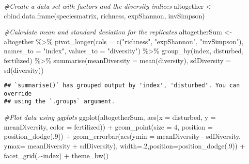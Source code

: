 \documentclass[
]{article}
\newenvironment{Shaded}{\begin{snugshade}}{\end{snugshade}}
\newcommand{\AttributeTok}[1]{\textcolor[rgb]{0.77,0.63,0.00}{#1}}
\newcommand{\CommentTok}[1]{\textcolor[rgb]{0.56,0.35,0.01}{\textit{#1}}}
\newcommand{\DecValTok}[1]{\textcolor[rgb]{0.00,0.00,0.81}{#1}}
\newcommand{\FunctionTok}[1]{\textcolor[rgb]{0.00,0.00,0.00}{#1}}
\newcommand{\NormalTok}[1]{#1}
\newcommand{\OtherTok}[1]{\textcolor[rgb]{0.56,0.35,0.01}{#1}}
\newcommand{\SpecialCharTok}[1]{\textcolor[rgb]{0.00,0.00,0.00}{#1}}
\newcommand{\StringTok}[1]{\textcolor[rgb]{0.31,0.60,0.02}{#1}}
\begin{document}
\begin{Shaded}
\begin{Highlighting}[]
\CommentTok{\#Create a data set with factors and the diversity indices }
\NormalTok{altogether }\OtherTok{\textless{}{-}} \FunctionTok{cbind.data.frame}\NormalTok{(speciesmatrix, richness, expShannon, invSimpson)}

\CommentTok{\#Calculate mean and standard deviation for the replicates}
\NormalTok{altogetherSum }\OtherTok{\textless{}{-}}\NormalTok{ altogether }\SpecialCharTok{\%\textgreater{}\%}
  \FunctionTok{pivot\_longer}\NormalTok{(}\AttributeTok{cols =} \FunctionTok{c}\NormalTok{(}\StringTok{"richness"}\NormalTok{, }\StringTok{"expShannon"}\NormalTok{, }\StringTok{"invSimpson"}\NormalTok{), }
               \AttributeTok{names\_to =} \StringTok{"index"}\NormalTok{, }\AttributeTok{values\_to =} \StringTok{"diversity"}\NormalTok{) }\SpecialCharTok{\%\textgreater{}\%}
  \FunctionTok{group\_by}\NormalTok{(index, disturbed, fertilized) }\SpecialCharTok{\%\textgreater{}\%}
  \FunctionTok{summarise}\NormalTok{(}\AttributeTok{meanDiversity =} \FunctionTok{mean}\NormalTok{(diversity), }\AttributeTok{sdDiversity =} \FunctionTok{sd}\NormalTok{(diversity))}
\end{Highlighting}
\end{Shaded}

\begin{verbatim}
## `summarise()` has grouped output by 'index', 'disturbed'. You can override
## using the `.groups` argument.
\end{verbatim}

\begin{Shaded}
\begin{Highlighting}[]
\CommentTok{\#Plot data using ggplots}
\FunctionTok{ggplot}\NormalTok{(altogetherSum, }\FunctionTok{aes}\NormalTok{(}\AttributeTok{x =}\NormalTok{ disturbed, }\AttributeTok{y =}\NormalTok{ meanDiversity, }\AttributeTok{color =}\NormalTok{ fertilized)) }\SpecialCharTok{+}
  \FunctionTok{geom\_point}\NormalTok{(}\AttributeTok{size =} \DecValTok{4}\NormalTok{, }\AttributeTok{position =} \FunctionTok{position\_dodge}\NormalTok{(.}\DecValTok{9}\NormalTok{)) }\SpecialCharTok{+}
  \FunctionTok{geom\_errorbar}\NormalTok{(}\FunctionTok{aes}\NormalTok{(}\AttributeTok{ymin =}\NormalTok{ meanDiversity }\SpecialCharTok{{-}}\NormalTok{ sdDiversity, }\AttributeTok{ymax=}\NormalTok{ meanDiversity }\SpecialCharTok{+}\NormalTok{ sdDiversity),}
  \AttributeTok{width=}\NormalTok{.}\DecValTok{2}\NormalTok{,}\AttributeTok{position=}\FunctionTok{position\_dodge}\NormalTok{(.}\DecValTok{9}\NormalTok{)) }\SpecialCharTok{+} \FunctionTok{facet\_grid}\NormalTok{(.}\SpecialCharTok{\textasciitilde{}}\NormalTok{index) }\SpecialCharTok{+} \FunctionTok{theme\_bw}\NormalTok{()}
\end{Highlighting}
\end{Shaded}
\end{document}

